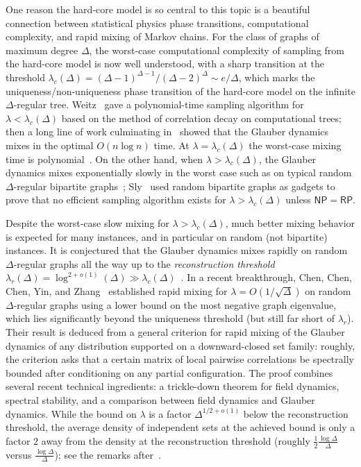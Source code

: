 \documentclass[10pt,a4paper]{amsart}
\begin{document}
	
	
	One reason the hard-core model is so central to this topic is a beautiful connection between statistical physics phase transitions, computational complexity, and rapid mixing of Markov chains.
	For the class of graphs of maximum degree $\Delta$, the worst-case computational complexity of sampling from the hard-core model is now well understood, with a sharp transition at the  threshold $\lambda_c(\Delta) = (\Delta-1)^{\Delta-1}/(\Delta-2)^\Delta \sim e/\Delta$, which marks the uniqueness/non-uniqueness phase transition of the hard-core model on the infinite $\Delta$-regular tree.  Weitz~\cite{Wei06} gave a polynomial-time  sampling algorithm for $\lambda < \lambda_c(\Delta)$ based on the method of correlation decay on computational trees; then a long line of work culminating in~\cite{ALO20, CLV23,CLV21}  showed that the 
	Glauber dynamics mixes in the optimal $O(n\log n)$ time. At $\lambda=\lambda_c(\Delta)$ the worst-case mixing time is polynomial~\cite{chen2025rapid-unique}. 
	On the other hand, when $\lambda> \lambda_c(\Delta)$, the Glauber dynamics mixes exponentially slowly in the 
	worst case such as on typical random $\Delta$-regular bipartite graphs~\cite{MWW09}; 
	Sly~\cite{Sly10} used random bipartite graphs as gadgets to prove that no efficient sampling algorithm  exists for $\lambda > \lambda_c(\Delta)$ unless $\mathsf{NP}=\mathsf{RP}$. 
	
	
	Despite the worst-case slow mixing for $\lambda > \lambda_c(\Delta)$, much 
	better mixing behavior is expected for many instances, and in particular on random (not bipartite) instances. It is conjectured that the Glauber dynamics mixes rapidly  on random $\Delta$-regular graphs  all the way up to the \textit{reconstruction threshold} 
	$\lambda_r(\Delta) = \log ^{2+o(1)} (\Delta) \gg  \lambda_c(\Delta)$~\cite{brightwell2004second,bhatnagar2016decay}.   In a recent breakthrough, Chen, Chen, Chen, Yin, and Zhang~\cite{chen2025rapid} established rapid mixing 
	for $\lambda = O(1/\sqrt{\Delta})$ on random $\Delta$-regular graphs using a lower bound on the most negative graph eigenvalue, which lies significantly beyond the uniqueness threshold (but still far short of $\lambda_r$).  Their result is deduced 
	from a general criterion for rapid mixing of the Glauber dynamics of any distribution supported on a downward-closed set family: roughly, the criterion asks that a certain matrix 
	of local pairwise correlations be spectrally bounded after conditioning on any partial configuration. The proof combines several recent technical ingredients: a trickle-down theorem for field dynamics, spectral stability, and a comparison between field dynamics and Glauber dynamics.  While the bound on $\lambda$ is a factor $\Delta^{1/2 +o(1)}$ below  the reconstruction threshold, the average density of independent sets at the achieved bound is only a factor $2$ away from the density at the reconstruction threshold (roughly $\frac{1}{2} \frac{\log \Delta}{\Delta}$ versus $\frac{\log \Delta}{\Delta}$); see the remarks after~\cite[Theorem 1.1]{chen2025rapid}.
	
\end{document}
